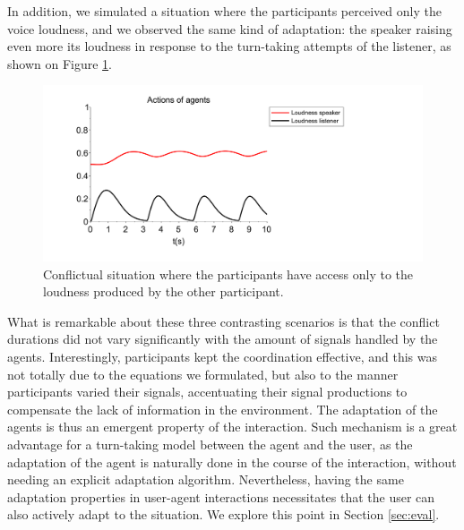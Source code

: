 In addition, we simulated a situation where the participants perceived only the voice loudness, and we observed the same kind of adaptation: the speaker raising even more its loudness in response to the turn-taking attempts of the listener, as shown on Figure \ref{adapt_volume}.

\begin{figure}
  \centering
  \includegraphics[width=\linewidth]{figure/adapt_volume.pdf}
  \caption{Conflictual situation where the participants have access only to the loudness produced by the other participant.}
  \label{adapt_volume}
\end{figure}

What is remarkable about these three contrasting scenarios is that the conflict durations did not vary significantly with the amount of signals handled by the agents. Interestingly, participants kept the coordination effective, and this was not totally due to the equations we formulated, but also to the manner participants varied their signals, accentuating their signal productions to compensate the lack of information in the environment. The adaptation of the agents is thus an emergent property of the interaction. Such mechanism is a great advantage for a turn-taking model between the agent and the user, as the adaptation of the agent is naturally done in the course of the interaction, without needing an explicit adaptation algorithm. Nevertheless, having the same adaptation properties in user-agent interactions necessitates that the user can also actively adapt to the situation. We explore this point in Section \ref{sec:eval}.